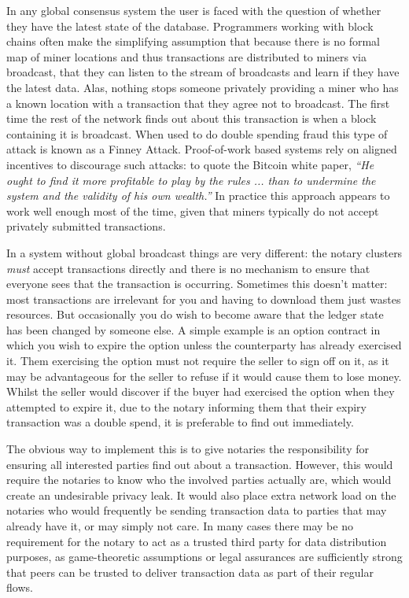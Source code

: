 \documentclass{article}
\begin{document}
In any global consensus system the user is faced with the question of whether they have the latest state of the
database. Programmers working with block chains often make the simplifying assumption that because there is no
formal map of miner locations and thus transactions are distributed to miners via broadcast, that they can listen
to the stream of broadcasts and learn if they have the latest data. Alas, nothing stops someone privately providing
a miner who has a known location with a transaction that they agree not to broadcast. The first time the rest of
the network finds out about this transaction is when a block containing it is broadcast. When used to do double
spending fraud this type of attack is known as a Finney Attack\cite{FinneyAttack}. Proof-of-work based systems rely
on aligned incentives to discourage such attacks: to quote the Bitcoin white paper, \emph{``He ought to find it
more profitable to play by the rules ... than to undermine the system and the validity of his own wealth.''} In
practice this approach appears to work well enough most of the time, given that miners typically do not accept
privately submitted transactions.

In a system without global broadcast things are very different: the notary clusters \emph{must} accept transactions
directly and there is no mechanism to ensure that everyone sees that the transaction is occurring. Sometimes this
doesn't matter: most transactions are irrelevant for you and having to download them just wastes resources. But
occasionally you do wish to become aware that the ledger state has been changed by someone else. A simple example
is an option contract in which you wish to expire the option unless the counterparty has already exercised it. Them
exercising the option must not require the seller to sign off on it, as it may be advantageous for the seller to
refuse if it would cause them to lose money. Whilst the seller would discover if the buyer had exercised the option
when they attempted to expire it, due to the notary informing them that their expiry transaction was a double
spend, it is preferable to find out immediately.

The obvious way to implement this is to give notaries the responsibility for ensuring all interested parties find
out about a transaction. However, this would require the notaries to know who the involved parties actually are,
which would create an undesirable privacy leak. It would also place extra network load on the notaries who would
frequently be sending transaction data to parties that may already have it, or may simply not care. In many cases
there may be no requirement for the notary to act as a trusted third party for data distribution purposes, as
game-theoretic assumptions or legal assurances are sufficiently strong that peers can be trusted to deliver
transaction data as part of their regular flows.
\end{document}
